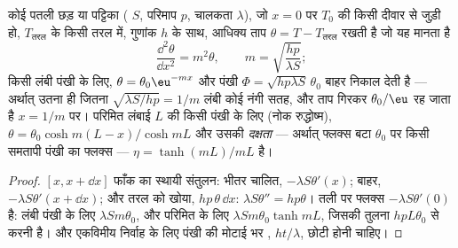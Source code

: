 \begin{proposition}[शीतलक पंखी]\label{prop:b2:heat-conduction:fin}
कोई पतली छड़ या पट्टिका ( $S$, परिमाप $p$, चालकता $\lambda$),
जो $x = 0$ पर $T_0$ की किसी दीवार से जुड़ी हो, $T_{\text{तरल}}$ के किसी तरल में,
गुणांक $h$ के साथ, आधिक्य ताप $\theta = T - T_{\text{तरल}}$
रखती है जो यह मानता है
\[
\frac{\dd^2\theta}{\dd x^2} = m^2\theta, \qquad m = \sqrt{\frac{hp}{\lambda S}} ;
\]
किसी लंबी पंखी के लिए, $\theta = \theta_0\eu^{-mx}$ और पंखी $\Phi =
\sqrt{hp\lambda S}\,\theta_0$ बाहर निकाल देती है --- अर्थात् उतना ही जितना $\sqrt{\lambda
S/hp} = 1/m$ लंबी कोई नंगी सतह, और ताप गिरकर $\theta_0/\eu$ रह जाता है
$x = 1/m$ पर। परिमित लंबाई $L$ की किसी पंखी के लिए (नोक रुद्धोष्म), $\theta =
\theta_0\cosh m(L-x)/\cosh mL$ और उसकी \emph{दक्षता} --- अर्थात् फ्लक्स बटा $\theta_0$ पर किसी समतापी पंखी का फ्लक्स ---
$\eta = \tanh(mL)/mL$ है।
\end{proposition}

\begin{proof}
$[x, x + \dd x]$ फाँक का स्थायी संतुलन: भीतर चालित,
$-\lambda S\theta'(x)$; बाहर, $-\lambda S\theta'(x + \dd x)$; और तरल को
खोया, $hp\,\theta\,\dd x$: $\lambda S\theta'' = hp\theta$। तली पर
फ्लक्स $-\lambda S\theta'(0)$ है: लंबी पंखी के लिए $\lambda Sm\theta_0$,
और परिमित के लिए $\lambda Sm\theta_0\tanh mL$, जिसकी तुलना
$hpL\theta_0$ से करनी है। और एकविमीय निर्वाह के लिए पंखी की मोटाई भर
, $ht/\lambda$, छोटी होनी चाहिए।
\end{proof}

